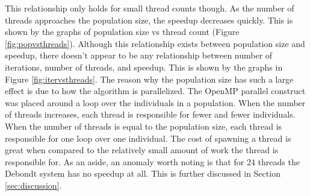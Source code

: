 \documentclass[10pt,letterpaper]{article}
\begin{document}
\newpage

This relationship only holds for small thread counts though. As the number of threads approaches the population size, the speedup decreases quickly. This is shown by the graphs of population size vs thread count (Figure \ref{fig:popvsthreads}). Although this relationship exists between population size and speedup, there doesn't appear to be any relationship between number of iterations, number of threads, and speedup. This is shown by the graphs in Figure \ref{fig:itervsthreads}. The reason why the population size has such a large effect is due to how the algorithm is parallelized. The OpenMP parallel construct was placed around a loop over the individuals in a population. When the number of threads increases, each thread is responsible for fewer and fewer individuals. When the number of threads is equal to the population size, each thread is responsible for one loop over one individual. The cost of spawning a thread is great when compared to the relatively small amount of work the thread is responsible for. As an aside, an anomaly worth noting is that for 24 threads the Debondt system has no speedup at all. This is further discussed in Section \ref{sec:discussion}.
\end{document}
